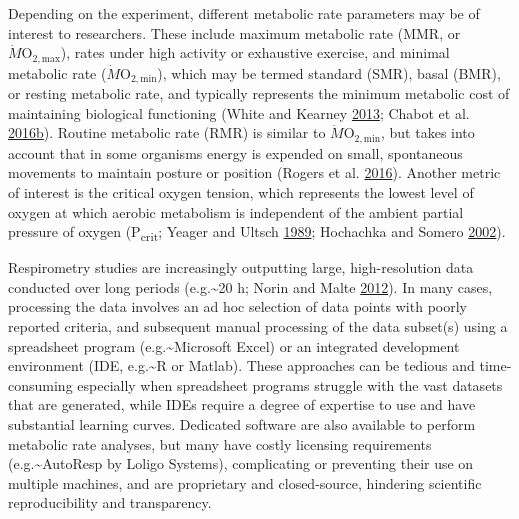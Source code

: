 \documentclass[a4paper,10pt, oneside]{memoir}
\begin{document}
Depending on the experiment, different metabolic rate parameters may be of interest to researchers.
These include maximum metabolic rate (MMR, or \(\dot{M}\mathrm{O_{2,max}}\)), rates under high activity or exhaustive exercise, and minimal metabolic rate (\(\dot{M}\mathrm{O_{2,min}}\)), which may be termed standard (SMR), basal (BMR), or resting metabolic rate, and typically represents the minimum metabolic cost of maintaining biological functioning (White and Kearney \protect\hyperlink{ref-White2013}{2013}; Chabot et al. \protect\hyperlink{ref-Chabot2016}{2016}\protect\hyperlink{ref-Chabot2016}{b}).
Routine metabolic rate (RMR) is similar to \(\dot{M}\mathrm{O_{2,min}}\), but takes into account that in some organisms energy is expended on small, spontaneous movements to maintain posture or position (Rogers et al. \protect\hyperlink{ref-Rogers2016}{2016}).
Another metric of interest is the critical oxygen tension, which represents the lowest level of oxygen at which aerobic metabolism is independent of the ambient partial pressure of oxygen (P\textsubscript{crit}; Yeager and Ultsch \protect\hyperlink{ref-Yeager1989}{1989}; Hochachka and Somero \protect\hyperlink{ref-Hochachka2002}{2002}).

Respirometry studies are increasingly outputting large, high-resolution data conducted over long periods (e.g.\textasciitilde{}20 h; Norin and Malte \protect\hyperlink{ref-Norin2012}{2012}).
In many cases, processing the data involves an ad hoc selection of data points with poorly reported criteria, and subsequent manual processing of the data subset(s) using a spreadsheet program (e.g.\textasciitilde{}Microsoft Excel) or an integrated development environment (IDE, e.g.\textasciitilde{}R or Matlab).
These approaches can be tedious and time-consuming especially when spreadsheet programs struggle with the vast datasets that are generated, while IDEs require a degree of expertise to use and have substantial learning curves.
Dedicated software are also available to perform metabolic rate analyses, but many have costly licensing requirements (e.g.\textasciitilde{}AutoResp by Loligo Systems), complicating or preventing their use on multiple machines, and are proprietary and closed-source, hindering scientific reproducibility and transparency.
\end{document}
